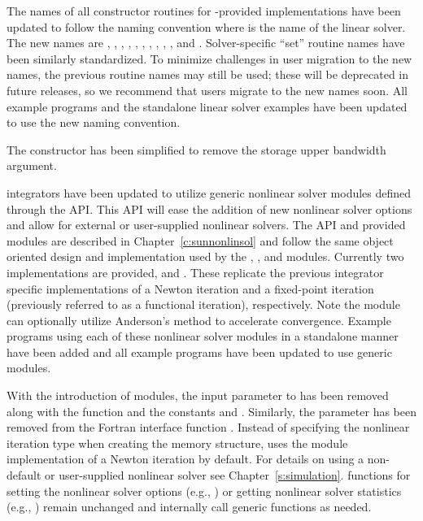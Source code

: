 The names of all constructor routines for {\sundials}-provided
{\sunlinsol} implementations have been updated to follow the naming convention
 where \id{*} is the name of the linear solver. The new names
are
,
,
,
,\newline
{},
,
,
,
,
, and
.  Solver-specific ``set'' routine names have
been similarly standardized.  To minimize challenges in user migration
to the new names, the previous routine names may still be used; these
will be deprecated in future releases, so we recommend that users
migrate to the new names soon. All {\cvode} example programs and the standalone
linear solver examples have been updated to use the new naming convention.

The  constructor has been simplified to remove the
storage upper bandwidth argument.

{\sundials} integrators have been updated to utilize generic nonlinear solver
modules defined through the {\sunnonlinsol} API. This API will ease the addition
of new nonlinear solver options and allow for external or user-supplied
nonlinear solvers. The {\sunnonlinsol} API and {\sundials} provided modules are
described in Chapter~\ref{c:sunnonlinsol} and follow the same object oriented
design and implementation used by the {\nvector}, {\sunmatrix}, and {\sunlinsol}
modules. Currently two {\sunnonlinsol} implementations are provided,
{\sunnonlinsolnewton} and {\sunnonlinsolfixedpoint}. These replicate the
previous integrator specific implementations of a Newton iteration and a
fixed-point iteration (previously referred to as a functional iteration),
respectively. Note the {\sunnonlinsolfixedpoint} module can optionally utilize
Anderson's method to accelerate convergence. Example programs using each of
these nonlinear solver modules in a standalone manner have been added and all
{\cvode} example programs have been updated to use generic {\sunnonlinsol}
modules.

With the introduction of {\sunnonlinsol} modules, the input parameter 
to  has been removed along with the function
 and the constants  and .
Similarly, the  parameter has been removed from the Fortran interface
function . Instead of specifying the nonlinear iteration type when
creating the {\cvode} memory structure, {\cvode} uses the {\sunnonlinsolnewton}
module implementation of a Newton iteration by default. For details on using a
non-default or user-supplied nonlinear solver see Chapter~\ref{s:simulation}.
{\cvode} functions for setting the nonlinear solver options (e.g.,
) or getting nonlinear solver statistics (e.g.,
) remain unchanged and internally call generic
{\sunnonlinsol} functions as needed.

